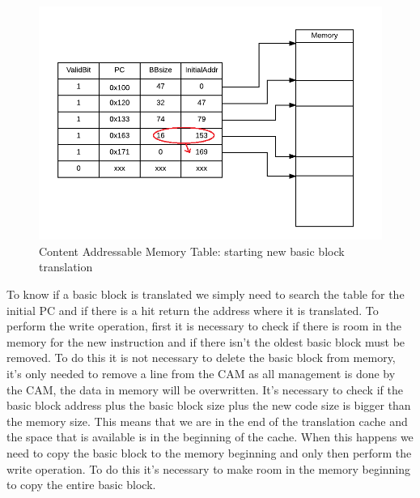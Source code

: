 \begin{figure} [h!]
	\centering
	\includegraphics[scale = 0.35]{Images/CAM_new_BB.png}
	\caption{Content Addressable Memory Table: starting new basic block translation}
	\label{fig:CAMtableNewBB}
\end{figure}

To know if a basic block is translated we simply need to search the table for the initial PC and if there is a hit return the address where it is translated.
To perform the write operation, first it is necessary to check if there is room in the memory for the new instruction and if there isn't the oldest basic block must be removed. To do this it is not necessary to delete the basic block from memory, it's only needed to remove a line from the CAM as all management is done by the CAM, the data in memory will be overwritten. It's necessary to check if the basic block address plus the basic block size plus the new code size is bigger than the memory size. This means that we are in the end of the translation cache and the space that is available is in the beginning of the cache. When this happens we need to copy the basic block to the memory beginning and only then perform the write operation. To do this it's necessary to make room in the memory beginning to copy the entire basic block.


